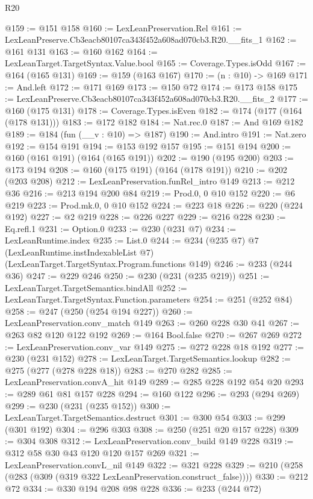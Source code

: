 \begin{lexlean}{R20}
\begin{coremodule}
@159 := @151 @158
@160 := LexLeanPreservation.Rel
@161 := LexLeanPreserve.Cb3eacb80107ca343f452a608ad070cb3.R20.__fits_1
@162 := @161 @131
@163 := @160 @162
@164 := LexLeanTarget.TargetSyntax.Value.bool
@165 := Coverage.Types.isOdd
@167 := @164 (@165 @131)
@169 := @159 (@163 @167)
@170 := (n : @10) -> @169
@171 := And.left
@172 := @171 @169
@173 := @150 @72
@174 := @173 @158
@175 := LexLeanPreserve.Cb3eacb80107ca343f452a608ad070cb3.R20.__fits_2
@177 := @160 (@175 @131)
@178 := Coverage.Types.isEven
@182 := @174 (@177 (@164 (@178 @131)))
@183 := @172 @182
@184 := Nat.rec.{0}
@187 := And @169 @182
@189 := @184 (fun (__v : @10) => @187)
@190 := And.intro
@191 := Nat.zero
@192 := @154 @191
@194 := @153 @192 @157
@195 := @151 @194
@200 := @160 (@161 @191) (@164 (@165 @191))
@202 := @190 (@195 @200)
@203 := @173 @194
@208 := @160 (@175 @191) (@164 (@178 @191))
@210 := @202 (@203 @208)
@212 := LexLeanPreservation.funRel_intro @149
@213 := @212 @36
@216 := @213 @194 @200 @84
@219 := Prod.{0, 0} @10 @152
@220 := @6 @219
@223 := Prod.mk.{0, 0} @10 @152
@224 := @223 @18
@226 := @220 (@224 @192)
@227 := @2 @219
@228 := @226 @227
@229 := @216 @228
@230 := Eq.refl.{1}
@231 := Option.{0}
@233 := @230 (@231 @7)
@234 := LexLeanRuntime.index
@235 := List.{0}
@244 := @234
    (@235 @7)
    @7
    (LexLeanRuntime.instIndexableList @7)
    (LexLeanTarget.TargetSyntax.Program.functions @149)
@246 := @233 (@244 @36)
@247 := @229 @246
@250 := @230 (@231 (@235 @219))
@251 := LexLeanTarget.TargetSemantics.bindAll
@252 := LexLeanTarget.TargetSyntax.Function.parameters
@254 := @251 (@252 @84)
@258 := @247 (@250 (@254 @194 @227))
@260 := LexLeanPreservation.conv_match @149
@263 := @260 @228 @30 @41
@267 := @263 @82 @120 @122 @192
@269 := @164 Bool.false
@270 := @267 @269
@272 := LexLeanPreservation.conv_var @149
@275 := @272 @228 @18 @192
@277 := @230 (@231 @152)
@278 := LexLeanTarget.TargetSemantics.lookup
@282 := @275 (@277 (@278 @228 @18))
@283 := @270 @282
@285 := LexLeanPreservation.convA_hit @149
@289 := @285 @228 @192 @54 @20
@293 := @289 @61 @81 @157 @228
@294 := @160 @122
@296 := @293 (@294 @269)
@299 := @230 (@231 (@235 @152))
@300 := LexLeanTarget.TargetSemantics.destruct
@301 := @300 @54
@303 := @299 (@301 @192)
@304 := @296 @303
@308 := @250 (@251 @20 @157 @228)
@309 := @304 @308
@312 := LexLeanPreservation.conv_build @149 @228
@319 := @312 @58 @30 @43 @120 @120 @157 @269
@321 := LexLeanPreservation.convL_nil @149
@322 := @321 @228
@329 := @210 (@258 (@283 (@309 (@319 @322 LexLeanPreservation.construct_false))))
@330 := @212 @72
@334 := @330 @194 @208 @98 @228
@336 := @233 (@244 @72)

\end{coremodule}
\end{lexlean}
